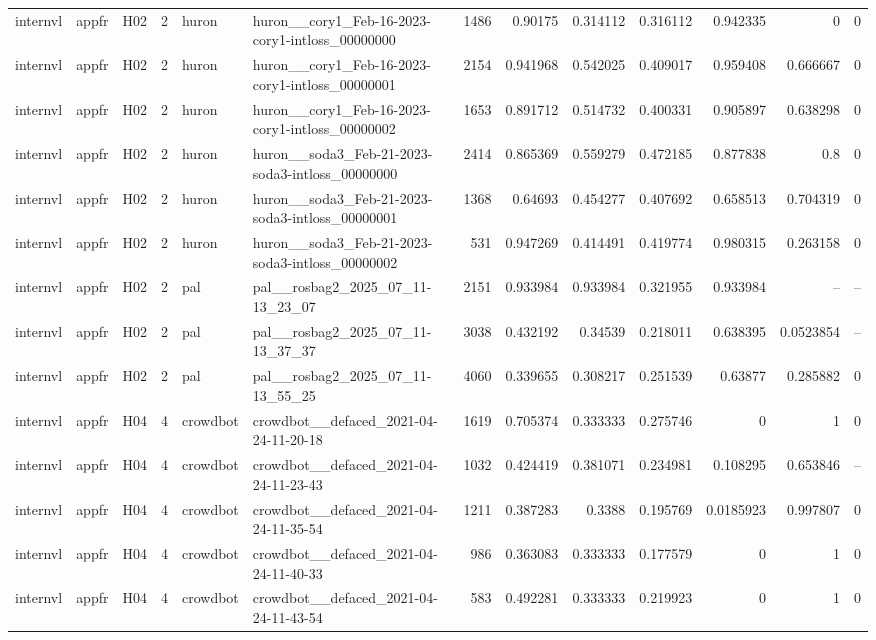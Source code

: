 \begin{longtable}{lllrllrrrrrrr}
internvl & appfr & H02 & 2 & huron & huron\_\_cory1\_Feb-16-2023-cory1-intloss\_00000000 & 1486 & 0.90175 & 0.314112 & 0.316112 & 0.942335 & 0 & 0 \\
internvl & appfr & H02 & 2 & huron & huron\_\_cory1\_Feb-16-2023-cory1-intloss\_00000001 & 2154 & 0.941968 & 0.542025 & 0.409017 & 0.959408 & 0.666667 & 0 \\
internvl & appfr & H02 & 2 & huron & huron\_\_cory1\_Feb-16-2023-cory1-intloss\_00000002 & 1653 & 0.891712 & 0.514732 & 0.400331 & 0.905897 & 0.638298 & 0 \\
internvl & appfr & H02 & 2 & huron & huron\_\_soda3\_Feb-21-2023-soda3-intloss\_00000000 & 2414 & 0.865369 & 0.559279 & 0.472185 & 0.877838 & 0.8 & 0 \\
internvl & appfr & H02 & 2 & huron & huron\_\_soda3\_Feb-21-2023-soda3-intloss\_00000001 & 1368 & 0.64693 & 0.454277 & 0.407692 & 0.658513 & 0.704319 & 0 \\
internvl & appfr & H02 & 2 & huron & huron\_\_soda3\_Feb-21-2023-soda3-intloss\_00000002 & 531 & 0.947269 & 0.414491 & 0.419774 & 0.980315 & 0.263158 & 0 \\
internvl & appfr & H02 & 2 & pal & pal\_\_rosbag2\_2025\_07\_11-13\_23\_07 & 2151 & 0.933984 & 0.933984 & 0.321955 & 0.933984 & -- & -- \\
internvl & appfr & H02 & 2 & pal & pal\_\_rosbag2\_2025\_07\_11-13\_37\_37 & 3038 & 0.432192 & 0.34539 & 0.218011 & 0.638395 & 0.0523854 & -- \\
internvl & appfr & H02 & 2 & pal & pal\_\_rosbag2\_2025\_07\_11-13\_55\_25 & 4060 & 0.339655 & 0.308217 & 0.251539 & 0.63877 & 0.285882 & 0 \\
internvl & appfr & H04 & 4 & crowdbot & crowdbot\_\_defaced\_2021-04-24-11-20-18 & 1619 & 0.705374 & 0.333333 & 0.275746 & 0 & 1 & 0 \\
internvl & appfr & H04 & 4 & crowdbot & crowdbot\_\_defaced\_2021-04-24-11-23-43 & 1032 & 0.424419 & 0.381071 & 0.234981 & 0.108295 & 0.653846 & -- \\
internvl & appfr & H04 & 4 & crowdbot & crowdbot\_\_defaced\_2021-04-24-11-35-54 & 1211 & 0.387283 & 0.3388 & 0.195769 & 0.0185923 & 0.997807 & 0 \\
internvl & appfr & H04 & 4 & crowdbot & crowdbot\_\_defaced\_2021-04-24-11-40-33 & 986 & 0.363083 & 0.333333 & 0.177579 & 0 & 1 & 0 \\
internvl & appfr & H04 & 4 & crowdbot & crowdbot\_\_defaced\_2021-04-24-11-43-54 & 583 & 0.492281 & 0.333333 & 0.219923 & 0 & 1 & 0 \\

\end{longtable}

